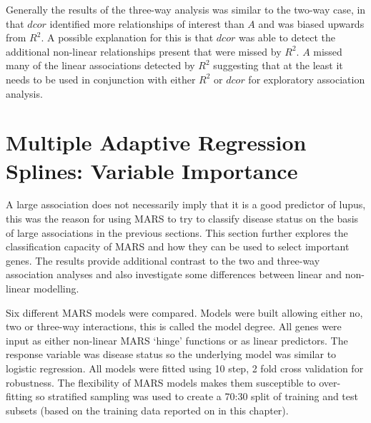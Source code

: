 \documentclass[a4paper, 12pt]{report}
\begin{document}
Generally the results of the three-way analysis was similar to the two-way case, in that $dcor$ identified more relationships of interest than $A$ and was biased upwards from $R^2$. A possible explanation for this is that $dcor$ was able to detect the additional non-linear relationships present that were missed by $R^2$. $A$ missed many of the linear associations detected by $R^2$ suggesting that at the least it needs to be used in conjunction with either $R^2$ or $dcor$ for exploratory association analysis.


\section{Multiple Adaptive Regression Splines: Variable Importance}
A large association does not necessarily imply that it is a good predictor of lupus, this was the reason for using MARS to try to classify disease status on the basis of large associations in the previous sections. This section further explores the classification capacity of MARS and how they can be used to select important genes. The results provide additional contrast to the two and three-way association analyses and also investigate some differences between linear and non-linear modelling.

Six different MARS models were compared. Models were built allowing either no, two or three-way interactions, this is called the model degree. All genes were input as either non-linear MARS `hinge' functions or as linear predictors. The response variable was disease status so the underlying model was similar to logistic regression. All models were fitted using 10 step, 2 fold cross validation for robustness. The flexibility of MARS models makes them susceptible to over-fitting so stratified sampling was used to create a 70:30 split of training and test subsets (based on the training data reported on in this chapter). 
\end{document}

